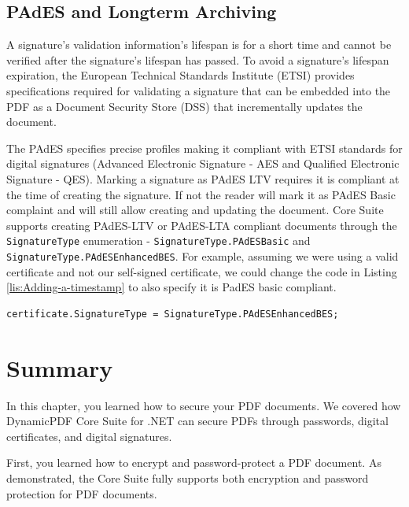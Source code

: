 \documentclass[american]{tufte-book}
\numberwithin{equation}{section}
\numberwithin{figure}{section}
\begin{document}
{\subsection{PAdES and Longterm Archiving}

A signature's validation information's lifespan is for a short time
and cannot be verified after the signature's lifespan has passed.
To avoid a signature's lifespan expiration, the European Technical
Standards Institute (ETSI) provides specifications required for validating
a signature that can be embedded into the PDF as a Document Security
Store (DSS) that incrementally updates the document.

The PAdES specifies precise profiles making it compliant with ETSI
standards for digital signatures (Advanced Electronic Signature -
AES and Qualified Electronic Signature - QES). Marking a signature
as PAdES LTV requires it is compliant at the time of creating the
signature. If not the reader will mark it as PAdES Basic complaint
and will still allow creating and updating the document. Core Suite
supports creating PAdES-LTV or PAdES-LTA compliant documents through
the \texttt{SignatureType} enumeration - \texttt{SignatureType.PAdESBasic}
and \texttt{SignatureType.PAdESEnhancedBES}. For example, assuming we were using a valid certificate and not our
self-signed certificate, we could change the code in Listing \ref{lis:Adding-a-timestamp}
to also specify it is PadES basic compliant.

\bgroup{}
\begin{lstlisting}[basicstyle={\footnotesize\ttfamily},breaklines=true]
certificate.SignatureType = SignatureType.PAdESEnhancedBES;
\end{lstlisting}
\leavevmode\egroup


\section{Summary}

In this chapter, you learned how to secure your PDF documents. We covered how DynamicPDF Core Suite for .NET can secure PDFs through passwords, digital certificates, and digital signatures.

First, you learned how to encrypt and password-protect a PDF document. As demonstrated, the Core Suite fully supports both encryption and password protection for PDF documents.

}
\end{document}
